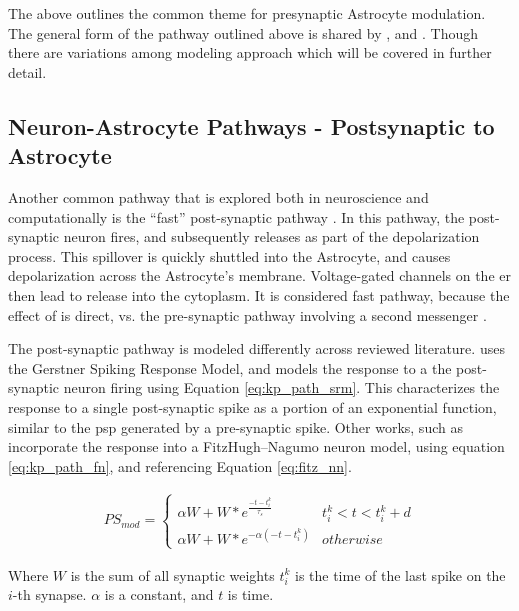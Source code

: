     The above outlines the common theme for presynaptic Astrocyte
    modulation. The general form of the pathway outlined above is shared by
    \parencite{postnov_2009}, and \parencite{wade_2011}. Though there are
    variations among modeling approach which will be covered in further detail.

    \subsection{Neuron-Astrocyte Pathways - Postsynaptic to Astrocyte}
    Another common pathway that is explored both in neuroscience and
    computationally is the ``fast'' post-synaptic pathway \parencite{bassam_2015}. In
    this pathway, the post-synaptic neuron fires, and subsequently releases \kp
    as part of the depolarization process. This \kp spillover is quickly shuttled
    into the Astrocyte, and causes depolarization across the Astrocyte's
    membrane. Voltage-gated channels on the \Gls{er} then lead to \ca release into
    the cytoplasm. It is considered fast pathway, because the effect of \kp is
    direct, vs. the pre-synaptic pathway involving a second messenger
    \parencite{bassam_2015}.

    The post-synaptic pathway is modeled differently across reviewed
    literature. \parencite{bassam_2015} uses the Gerstner Spiking Response
    Model, and models the \ca response to a the post-synaptic neuron firing
    using Equation \ref{eq:kp_path_srm}. This characterizes the response to a
    single post-synaptic spike as a portion of an exponential function, similar
    to the \Gls{psp} generated by a pre-synaptic spike. Other works, such as
    \parencite{postnov_2007} incorporate the \ca response into a FitzHugh–Nagumo
    neuron model, using equation \ref{eq:kp_path_fn}, and referencing Equation
    \ref{eq:fitz_nn}.

    \begin{align}
        PS_{mod} =
        \begin{cases}
          \alpha W + W * e^{\frac{-t - t^k_{i}}{\tau_s}} & t^k_{i} < t < t^k_{i}
          + d \\
          \alpha W + W * e^{-\alpha (-t - t^k_{i})} & otherwise
       \end{cases} \label{eq:kp_path_srm}      
    \end{align}

    Where $W$ is the sum of all synaptic weights $t^k_i$ is the time of the last
    spike on the $i$-th synapse. $\alpha$ is a constant, and $t$ is time.

